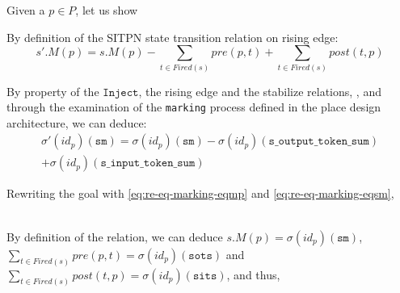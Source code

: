 \documentclass[dvipsnames,12pt]{article}
\begin{document}
\begin{niproof}

  Given a $p\in{}P$, let us show

  \exP{}
  
  By definition of the SITPN state transition relation on rising edge:
  \begin{equation}\label{eq:re-eq-marking-eqmp}
    s'.M(p)=s.M(p)-\sum\limits_{t\in{}Fired(s)}pre(p,t)+\sum\limits_{t\in{}Fired(s)}post(t,p)
  \end{equation}

  By property of the $\mathtt{Inject}$, the \hvhdl{} rising
  edge and the stabilize relations, \InCsCompP{}, and through the
  examination of the \texttt{marking} process defined in the place
  design architecture, we can deduce:
  \begin{equation}\label{eq:re-eq-marking-eqsm}
    \begin{split}
      \sigma'(id_p)(\texttt{sm})=\sigma(id_p)(\texttt{sm})-\sigma(id_p)(\texttt{s\_output\_token\_sum})\\
      +\sigma(id_p)(\texttt{s\_input\_token\_sum})
    \end{split}
  \end{equation}

  Rewriting the goal with \ref{eq:re-eq-marking-eqmp} and
  \ref{eq:re-eq-marking-eqsm},
  
  \\
  
  By definition of the  relation,
  we can deduce $s.M(p)=\sigma(id_p)(\texttt{sm})$,
  $\sum\limits_{t\in{}Fired(s)}pre(p,t)=\sigma(id_p)(\texttt{sots})$ and
  $\sum\limits_{t\in{}Fired(s)}post(t,p)=\sigma(id_p)(\texttt{sits})$, and thus, 

\end{niproof}
\end{document}
